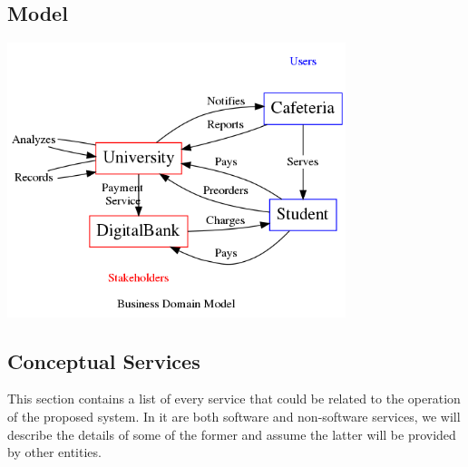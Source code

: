 \documentclass[11pt]{article}
\begin{document}
\subsection{Model}
\label{sec:orgdded4ae}
\begin{center}
\includegraphics[height=8cm]{res/business_domain.png}
\end{center}

\subsection{Conceptual Services}
\label{sec:orgdab1737}
This section contains a list of every service that could be related
to the operation of the proposed system. In it are both software
and non-software services, we will describe the details of some of
the former and assume the latter will be provided by other
entities.
\end{document}
